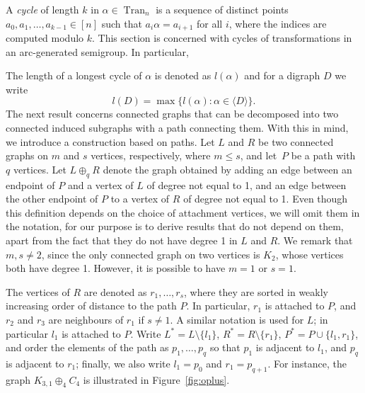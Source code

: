 \documentclass[10pt]{amsart}
\DeclareMathOperator{\Tran}{Tran}
\newcommand{\genset}[1]{\langle#1\rangle}
\newcommand{\nset}{[n]}
\begin{document}
A \emph{cycle} of length $k$ in $\alpha\in \Tran_n$ is a sequence of distinct
points $a_0, a_1, \dots, a_{k-1}\in\nset$ such that $a_i \alpha = a_{i+1}$ for
all $i$, where the indices are computed modulo $k$. This section is concerned
with cycles of transformations in an arc-generated semigroup. In particular,

The length of a longest cycle of $\alpha$ is denoted as $l(\alpha)$ and for a
digraph $D$ we write
\[l(D) = \max \{ l(\alpha) : \alpha \in \genset{D} \}.\]
\setcounter{figure}{1}
The next result concerns connected graphs that can be decomposed into two
connected induced subgraphs with a path connecting them. With this in mind, we
introduce a construction based on paths. Let $L$ and $R$ be two connected
graphs on $m$ and $s$ vertices, respectively, where $m \le s$, and let~$P$ be a
path with $q$ vertices. Let $L \oplus_q R$ denote the graph obtained by adding
an edge between an endpoint of $P$ and a vertex of $L$ of degree not equal to
1, and an edge between the other endpoint of $P$ to a vertex of $R$ of degree
not equal to 1. Even though this definition depends on the choice of
attachment vertices, we will omit them in the notation, for our purpose is to
derive results that do not depend on them, apart from the fact that they do not
have degree 1 in $L$ and $R$. We remark that $m, s \ne 2$, since the only
connected graph on two vertices is $K_2$, whose vertices both have degree 1.
However, it is possible to have $m=1$ or $s=1$.

The vertices of $R$ are denoted as $r_1, \dots, r_s$, where they are sorted in
weakly increasing order of distance to the path $P$. In particular, $r_1$ is
attached to $P$, and $r_2$ and $r_3$ are neighbours of $r_1$ if $s\not=1$. A
similar notation is used for $L$; in particular $l_1$ is attached to $P$. Write
$L^* = L \setminus \{ l_1 \}$, $R^* = R \setminus \{ r_1 \}$, $P^* = P \cup
\{l_1, r_1\}$, and order the elements of the path as $p_1, \dots, p_q$ so that
$p_1$ is adjacent to $l_1$, and $p_q$ is adjacent to $r_1$; finally, we also
write $l_1 = p_0$ and $r_1 = p_{q+1}$. For instance, the graph $K_{3,1}
\oplus_4 C_4$ is illustrated in Figure~\ref{fig:oplus}.
\end{document}
